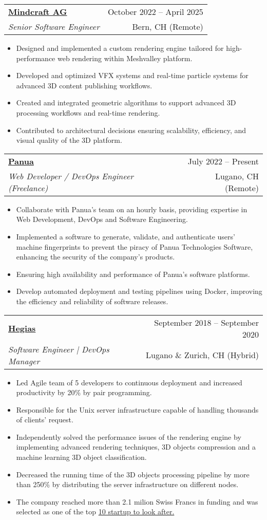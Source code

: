\documentclass[letterpaper,10pt]{article}
\makeatletter
\newcommand{\resumeItem}[1]{
  \item\small{
    {#1 \vspace{-1pt}}
  }
}
\newcommand{\resumeSubheading}[4]{
  \vspace{-1pt}\item
    \begin{tabular*}{\textwidth}[t]{l@{\extracolsep{\fill}}r}
      \textbf{#1} & {\color{dark-grey}\small #2}\vspace{1pt}\\ %
      \textit{#3} & {\color{dark-grey} \small #4}\\ %
    \end{tabular*}\vspace{-4pt}
}
\newcommand{\resumeItemListStart}{\begin{itemize}}
\newcommand{\resumeItemListEnd}{\end{itemize}}
\makeatother
\begin{document}
  \resumeSubheading
      {\href{https://mndcr.com/}{Mindcraft AG}}{October 2022 -- April 2025}
      {Senior Software Engineer}{Bern, CH (Remote)}
      \resumeItemListStart
        \resumeItem{Designed and implemented a custom rendering engine tailored for high-performance web rendering within Meshvalley platform.}
        \resumeItem{Developed and optimized VFX systems and real-time particle systems for advanced 3D content publishing workflows.}
        \resumeItem{Created and integrated geometric algorithms to support advanced 3D processing workflows and real-time rendering.}
        \resumeItem{Contributed to architectural decisions ensuring scalability, efficiency, and visual quality of the 3D platform.}
      \resumeItemListEnd

    \resumeSubheading
      {\href{https://panua.ch/}{Panua}}{July 2022 -- Present}
      {Web Developer / DevOps Engineer (Freelance)}{Lugano, CH (Remote)}
      \resumeItemListStart
      \resumeItem{Collaborate with Panua's team on an hourly basis, providing expertise in Web Development, DevOps and Software Engineering.}
      \resumeItem{Implemented a software to generate, validate, and authenticate users' machine fingerprints to prevent the piracy of Panua Technologies Software, enhancing the security of the company's products.}
      \resumeItem{Ensuring high availability and performance of Panua's software platforms.}
      \resumeItem{Develop automated deployment and testing pipelines using Docker, improving the efficiency and reliability of software releases.}
    \resumeItemListEnd

    \resumeSubheading
      {\href{https://hegias.com/en/}{Hegias}}{September 2018 -- September 2020}
      {Software Engineer | DevOps Manager}{Lugano \& Zurich, CH (Hybrid)}
      \resumeItemListStart
       \resumeItem{Led Agile team of 5 developers to continuous deployment and increased productivity by 20\% by pair programming.}
        \resumeItem{Responsible for the Unix server infrastructure capable of handling thousands of clients’ request.}
        \resumeItem{Independently solved the performance issues of the rendering engine by implementing advanced rendering techniques, 3D objects compression and a machine learning 3D object classification.}
        \resumeItem{Decreased the running time of the 3D objects processing pipeline by more than 250\% by distributing the server infrastructure on different nodes.}
        \resumeItem{The company reached more than 2.1 milion Swiss Francs in funding and was selected  as one of the top \href{https://www.eu-startups.com/2019/02/10-swiss-startups-to-watch-in-2019/}{10 startup to look after.}}
      \resumeItemListEnd
      
\end{document}
